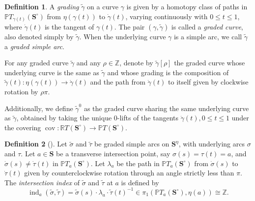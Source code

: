 \documentclass[11pt,a4paper,reqno]{amsart}%
\theoremstyle{plain}
\theoremstyle{definition}
\newtheorem{definition}[definition]{Definition}
\numberwithin{equation}{section}
\numberwithin{equation}{section}
\def\ZZ{\mathbb{Z}}
\def\surf{\mathbf{S}} %
\def\surfi{\surf^\circ}
\newcommand{\gind}{\operatorname{ind}\nolimits}
\def\grad{\eta}
\newcommand{\gms}{\surf^\grad}
\def\surf{\mathbf{S}}                       %
\begin{document}
\begin{definition}\label{def:gcurve} 
A \emph{grading} $\widetilde{\gamma}$ on a curve $\gamma$ is given by a homotopy class of paths in $\mathbb{P}T_{\gamma(t)}(\surfi)$ from $\grad(\gamma(t))$ to $\dot{\gamma}(t)$, varying continuously with $0\leq t\leq 1$, where $\dot{\gamma}(t)$ is the tangent of $ {\gamma}(t)$. The pair $(\gamma,\widetilde{\gamma})$   is called a {\it graded curve},  also denoted simply by $\widetilde{\gamma}$.  
When the underlying curve $\gamma$  is a simple arc, we call  
 $\widetilde{\gamma}$ 
 a \emph{graded simple arc}.



For any graded curve $\widetilde{\gamma}$ and any $\rho\in\ZZ$, denote by $\widetilde{\gamma}[\rho]$ the graded curve whose underlying curve is the same as $\widetilde{\gamma}$ and whose grading is the composition of $\widetilde{\gamma}(t):\grad(\gamma(t))\to\dot{\gamma}(t)$ and the path from $\dot{\gamma}(t)$ to itself given by clockwise rotation by $\rho\pi$. 


Additionally, we  define $\widetilde{\gamma}^0$  as the graded curve sharing the same underlying curve as $\widetilde{\gamma}$, obtained by taking the unique 0-lifts  of the tangents $\dot{\gamma}(t),0\leq t\leq 1$  under the covering
$\operatorname{cov}\colon \mathbb{R}T(\surfi) \longrightarrow \mathbb{P}T(\surfi)$.

\end{definition}

\begin{definition}[{\cite[Section~2.1]{HKK}}]\label{def:gind}
Let $\widetilde{\sigma}$ and $\widetilde{\tau}$ be graded simple arcs on $\gms$, with underlying arcs $\sigma$ and $\tau$. Let $a\in\surf$ be a transverse intersection point, say $\sigma(s)=\tau(t)=a$, and $\dot{\sigma}(s)\ne\dot{\tau}(t)$ in $\mathbb{P}T_a(\surfi)$. Let $\lambda_a$ be the path in $\mathbb{P}T_a(\surfi)$ from $\dot{\sigma}(s)$ to $\dot{\tau}(t)$ given by counterclockwise rotation through an angle strictly less than $\pi$. The \emph{intersection index} of $\widetilde{\sigma}$ and $\widetilde{\tau}$ at $a$ is defined by
\begin{equation}\label{eq:gind}
\gind_a(\widetilde{\sigma},\widetilde{\tau})=\widetilde{\sigma}(s)\cdot\lambda_a\cdot\widetilde{\tau}(t)^{-1}\in\pi_1(\mathbb{P}T_a(\surfi),\grad(a))\cong\ZZ.
\end{equation}
\end{definition}
\end{document}
